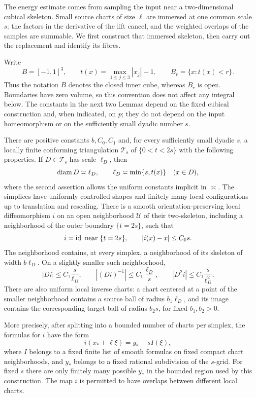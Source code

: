 The energy estimate comes from sampling the input near a
two-dimensional cubical skeleton.  Small source charts of size $\ell$
are immersed at one common scale $s$; the factors in the derivative of
the lift cancel, and the weighted overlaps of the samples are summable.
We first construct that immersed skeleton, then carry out the
replacement and identify its fibres.

Write
\[
 B=[-1,1]^3,\qquad t(x)=\max_{1\leq j\leq3}|x_j|-1,
 \qquad B_r=\{x:t(x)<r\}.
\]
Thus the notation $B$ denotes the closed inner cube, whereas $B_r$ is
open.  Boundaries have zero volume, so this convention does not affect
any integral below.  The constants in the next two Lemmas depend on the fixed cubical
construction and, when indicated, on $p$; they do not depend on the input
homeomorphism or on the sufficiently small dyadic number $s$.

\begin{lemma}\label{hp:immersed-skeleton}
There are positive constants $b,C_0,C_1$ and, for every sufficiently small
dyadic $s$, a locally finite conforming triangulation $\mathcal T_s$ of
$\{0<t<2s\}$ with the following properties.  If $D\in\mathcal T_s$ has
scale $\ell_D$, then
\[
 \operatorname{diam} D\asymp\ell_D,
 \qquad \ell_D\asymp\min\{s,t(x)\}\quad(x\in D),
\]
where the second assertion allows the uniform constants implicit in
$\asymp$.  The simplices have uniformly controlled shapes and finitely
many local configurations up to translation and rescaling.  There is a
smooth orientation-preserving local diffeomorphism $i$ on an open
neighborhood $\mathcal U$ of their two-skeleton, including a neighborhood
of the outer boundary $\{t=2s\}$, such that
\[
 i=\operatorname{id}\text{ near }\{t=2s\},\qquad
 |i(x)-x|\leq C_0s.
\]
The neighborhood contains, at every simplex, a neighborhood of its
skeleton of width $b\ell_D$.  On a slightly smaller such neighborhood,
\begin{equation}\label{hp:immersion-bounds}
 |Di|\leq C_1\frac{s}{\ell_D},\qquad
 |(Di)^{-1}|\leq C_1\frac{\ell_D}{s},\qquad
 |D^2i|\leq C_1\frac{s}{\ell_D^2}.
\end{equation}
There are also uniform local inverse charts: a chart centered at a
point of the smaller neighborhood contains a source ball of radius
$b_1\ell_D$, and its image contains the corresponding target ball of
radius $b_2s$, for fixed $b_1,b_2>0$.

More precisely, after splitting into a bounded number of charts per
simplex, the formulas for $i$ have the form
\begin{equation}\label{hp:immersion-template}
 i(x_*+\ell\xi)=y_*+sI(\xi),
\end{equation}
where $I$ belongs to a fixed finite list of smooth formulas on fixed
compact chart neighborhoods, and $y_*$ belongs to a fixed rational
subdivision of the $s$-grid.  For fixed $s$ there are only finitely many
possible $y_*$ in the bounded region used by this construction.  The
map $i$ is permitted to have overlaps between different local charts.
\end{lemma}

